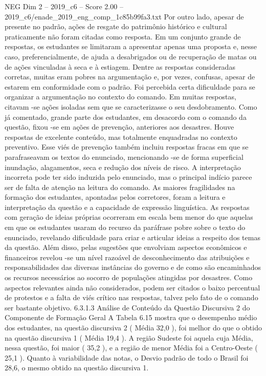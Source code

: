 \begin{textsample}{NEG Dim 2 – 2019\_c6 – Score 2.00 – 2019\_c6/enade\_2019\_eng\_comp\_1c85b99fa3.txt}
Por outro lado, apesar de presente no padrão, ações de resgate do patrimônio histórico e cultural praticamente não foram citadas como resposta.
Em um conjunto grande de respostas, os estudantes se limitaram a apresentar apenas uma proposta e, nesse caso, preferencialmente, de ajuda a desabrigados ou de recuperação de matas ou de ações vinculadas à seca e à estiagem.
Dentre as respostas consideradas corretas, muitas eram pobres na argumentação e, por vezes, confusas, apesar de estarem em conformidade com o padrão.
Foi percebida certa dificuldade para se organizar a argumentação no contexto do comando.
Em muitas respostas, citavam -se ações isoladas sem que se caracterizasse o seu desdobramento.
Como já comentado, grande parte dos estudantes, em desacordo com o comando da questão, fixou -se em ações de prevenção, anteriores aos desastres.
Houve respostas de excelente conteúdo, mas totalmente enquadradas no contexto preventivo.
Esse viés de prevenção também incluiu respostas fracas em que se parafraseavam os textos do enunciado, mencionando -se de forma superficial inundação, alagamentos, seca e redução dos níveis de risco.
A interpretação incorreta pode ter sido induzida pelo enunciado, mas o principal indício parece ser de falta de atenção na leitura do comando.
As maiores fragilidades na formação dos estudantes, apontadas pelos corretores, foram a leitura e interpretação da questão e a capacidade de expressão linguística.
As respostas com geração de ideias próprias ocorreram em escala bem menor do que aquelas em que os estudantes usaram do recurso da paráfrase pobre sobre o texto do enunciado, revelando dificuldade para criar e articular ideias a respeito dos temas da questão.
Além disso, pelas sugestões que envolviam aspectos econômicos e financeiros revelou -se um nível razoável de desconhecimento das atribuições e responsabilidades das diversas instâncias do governo e de como são encaminhados os recursos necessários ao socorro de populações atingidas por desastres.
Como aspectos relevantes ainda não considerados, podem ser citados o baixo percentual de protestos e a falta de viés crítico nas respostas, talvez pelo fato de o comando ser bastante objetivo. 6.3.1.3 Análise de Conteúdo da Questão Discursiva 2 do Componente de Formação Geral A Tabela 6.15 mostra que o desempenho médio dos estudantes, na questão discursiva 2 ( Média 32,0 ), foi melhor do que o obtido na questão discursiva 1 ( Média 19,4 ).
A região Sudeste foi aquela cuja Média, nessa questão, foi maior ( 35,2 ), e a região de menor Média foi a Centro-Oeste ( 25,1 ).
Quanto à variabilidade das notas, o Desvio padrão de todo o Brasil foi 28,6, o mesmo obtido na questão discursiva 1.

\end{textsample}
